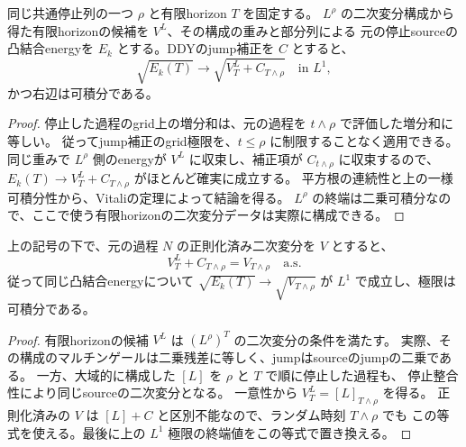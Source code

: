 \begin{lemma}[閉じた停止後の終端平方根の $L^1$ 極限]
同じ共通停止列の一つ $\rho$ と有限horizon $T$ を固定する。
$L^\rho$ の二次変分構成から得た有限horizonの候補を $V^L$、その構成の重みと部分列による
元の停止sourceの凸結合energyを $E_k$ とする。DDYのjump補正を $C$ とすると、
\[
 \sqrt{E_k(T)}\longrightarrow
 \sqrt{V^L_T+C_{T\wedge\rho}}\quad\text{in }L^1,
\]
かつ右辺は可積分である。
\end{lemma}
\begin{proof}
停止した過程のgrid上の増分和は、元の過程を $t\wedge\rho$ で評価した増分和に等しい。
従ってjump補正のgrid極限を、$t\le\rho$ に制限することなく適用できる。
同じ重みで $L^\rho$ 側のenergyが $V^L$ に収束し、補正項が $C_{t\wedge\rho}$ に収束するので、
$E_k(T)\to V^L_T+C_{T\wedge\rho}$ がほとんど確実に成立する。
平方根の連続性と上の一様可積分性から、Vitaliの定理によって結論を得る。
$L^\rho$ の終端は二乗可積分なので、ここで使う有限horizonの二次変分データは実際に構成できる。
\end{proof}

\begin{lemma}[元の二次変分の停止値との同定]
上の記号の下で、元の過程 $N$ の正則化済み二次変分を $V$ とすると、
\[
 V^L_T+C_{T\wedge\rho}=V_{T\wedge\rho}\quad\text{a.s.}
\]
従って同じ凸結合energyについて
$\sqrt{E_k(T)}\to\sqrt{V_{T\wedge\rho}}$ が $L^1$ で成立し、極限は可積分である。
\end{lemma}
\begin{proof}
有限horizonの候補 $V^L$ は $(L^\rho)^T$ の二次変分の条件を満たす。
実際、その構成のマルチンゲールは二乗残差に等しく、jumpはsourceのjumpの二乗である。
一方、大域的に構成した $[L]$ を $\rho$ と $T$ で順に停止した過程も、
停止整合性により同じsourceの二次変分となる。
一意性から $V^L_T=[L]_{T\wedge\rho}$ を得る。
正則化済みの $V$ は $[L]+C$ と区別不能なので、ランダム時刻 $T\wedge\rho$ でも
この等式を使える。最後に上の $L^1$ 極限の終端値をこの等式で置き換える。
\end{proof}


